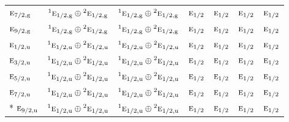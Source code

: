 \documentclass[10pt,a4paper]{article}
\numberwithin{equation}{section}
\newcommand{\irr}[1]{\text{\normalfont\scshape #1}}
\newcommand{\conjpair}[1]{{}^{#1}}
\newcommand{\ptag}[1]{\mathrm{#1}}
\begin{document}
{\begin{longtable}{@{}lcccccc@{}}
$\irr{e}_{7/2,\ptag{g}}$ & $\conjpair{1}\irr{e}_{1/2,\ptag{g}}\oplus \conjpair{2}\irr{e}_{1/2,\ptag{g}}$ & $\conjpair{1}\irr{e}_{1/2,\ptag{g}}\oplus \conjpair{2}\irr{e}_{1/2,\ptag{g}}$ & $\irr{e}_{1/2}$ & $\irr{e}_{1/2}$ & $\irr{e}_{1/2}$ & $\irr{e}_{1/2}$\\
$\irr{e}_{9/2,\ptag{g}}$ & $\conjpair{1}\irr{e}_{1/2,\ptag{g}}\oplus \conjpair{2}\irr{e}_{1/2,\ptag{g}}$ & $\conjpair{1}\irr{e}_{1/2,\ptag{g}}\oplus \conjpair{2}\irr{e}_{1/2,\ptag{g}}$ & $\irr{e}_{1/2}$ & $\irr{e}_{1/2}$ & $\irr{e}_{1/2}$ & $\irr{e}_{1/2}$\\
$\irr{e}_{1/2,\ptag{u}}$ & $\conjpair{1}\irr{e}_{1/2,\ptag{u}}\oplus \conjpair{2}\irr{e}_{1/2,\ptag{u}}$ & $\conjpair{1}\irr{e}_{1/2,\ptag{u}}\oplus \conjpair{2}\irr{e}_{1/2,\ptag{u}}$ & $\irr{e}_{1/2}$ & $\irr{e}_{1/2}$ & $\irr{e}_{1/2}$ & $\irr{e}_{1/2}$\\
$\irr{e}_{3/2,\ptag{u}}$ & $\conjpair{1}\irr{e}_{1/2,\ptag{u}}\oplus \conjpair{2}\irr{e}_{1/2,\ptag{u}}$ & $\conjpair{1}\irr{e}_{1/2,\ptag{u}}\oplus \conjpair{2}\irr{e}_{1/2,\ptag{u}}$ & $\irr{e}_{1/2}$ & $\irr{e}_{1/2}$ & $\irr{e}_{1/2}$ & $\irr{e}_{1/2}$\\
$\irr{e}_{5/2,\ptag{u}}$ & $\conjpair{1}\irr{e}_{1/2,\ptag{u}}\oplus \conjpair{2}\irr{e}_{1/2,\ptag{u}}$ & $\conjpair{1}\irr{e}_{1/2,\ptag{u}}\oplus \conjpair{2}\irr{e}_{1/2,\ptag{u}}$ & $\irr{e}_{1/2}$ & $\irr{e}_{1/2}$ & $\irr{e}_{1/2}$ & $\irr{e}_{1/2}$\\
$\irr{e}_{7/2,\ptag{u}}$ & $\conjpair{1}\irr{e}_{1/2,\ptag{u}}\oplus \conjpair{2}\irr{e}_{1/2,\ptag{u}}$ & $\conjpair{1}\irr{e}_{1/2,\ptag{u}}\oplus \conjpair{2}\irr{e}_{1/2,\ptag{u}}$ & $\irr{e}_{1/2}$ & $\irr{e}_{1/2}$ & $\irr{e}_{1/2}$ & $\irr{e}_{1/2}$\\*
$\irr{e}_{9/2,\ptag{u}}$ & $\conjpair{1}\irr{e}_{1/2,\ptag{u}}\oplus \conjpair{2}\irr{e}_{1/2,\ptag{u}}$ & $\conjpair{1}\irr{e}_{1/2,\ptag{u}}\oplus \conjpair{2}\irr{e}_{1/2,\ptag{u}}$ & $\irr{e}_{1/2}$ & $\irr{e}_{1/2}$ & $\irr{e}_{1/2}$ & $\irr{e}_{1/2}$\\
\bottomrule\end{longtable}}
\end{document}
